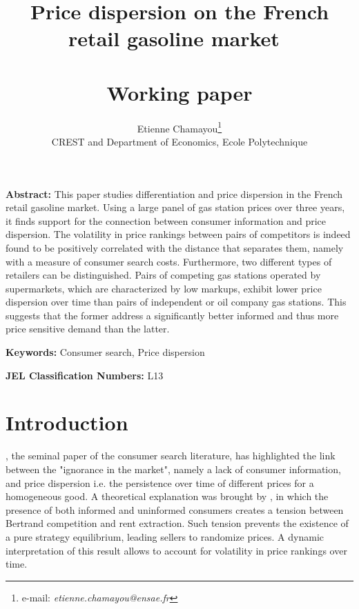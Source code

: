 \documentclass[english]{article}
\begin{document}
\title{Price dispersion on the French retail gasoline market\ \\ \ \\Working paper}
\author{Etienne Chamayou\thanks{e-mail:
\textit{etienne.chamayou@ensae.fr}}\medskip\\{\normalsize CREST and Department of Economics, Ecole Polytechnique }}
\maketitle

\sloppy%

\onehalfspacing

\textbf{Abstract:}
This paper studies differentiation and price dispersion in the French retail gasoline market. Using a large panel of gas station prices over three years, it finds support for the connection between consumer information and price dispersion. The volatility in price rankings between pairs of competitors is indeed found to be positively correlated with the distance that separates them, namely with a measure of consumer search costs. Furthermore, two different types of retailers can be distinguished. Pairs of competing gas stations operated by supermarkets, which are characterized by low markups, exhibit lower price dispersion over time than pairs of independent or oil company gas stations. This suggests that the former address a significantly better informed and thus more price sensitive demand than the latter.

\strut

\textbf{Keywords:} Consumer search, Price dispersion

\strut

\textbf{JEL Classification Numbers:} L13

\pagebreak%

\section{Introduction}

\cite{STI61}, the seminal paper of the consumer search literature, has highlighted the link between the "ignorance in the market", namely a lack of consumer information, and price dispersion i.e. the persistence over time of different prices for a homogeneous good. A theoretical explanation was brought by \cite{VAR80}, in which the presence of both informed and uninformed consumers creates a tension between Bertrand competition and rent extraction. Such tension prevents the existence of a pure strategy equilibrium, leading sellers to randomize prices. A dynamic interpretation of this result allows to account for volatility in price rankings over time.
\end{document}
